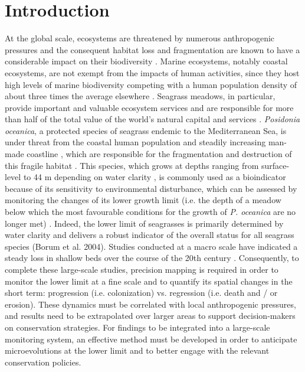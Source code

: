 \section{Introduction}\label{chapitre3_1}
At the global scale, ecosystems are threatened by numerous anthropogenic pressures \citep{hoekstra_confronting_2004, halpern_global_2008} and the consequent habitat loss and fragmentation are known to have a considerable impact on their biodiversity \citep{brooks_habitat_2002, haddad_habitat_2015}. Marine ecosystems, notably coastal ecosystems, are not exempt from the impacts of human activities, since they host high levels of marine biodiversity \citep{halpern_global_2008} competing with a human population density of about three times the average elsewhere \citep{small_global_2003}. Seagrass meadows, in particular, provide important and valuable ecosystem services and are responsible for more than half of the total value of the world’s natural capital and services \citep{costanza_value_1997, millenium_ecosystem_assessment_ecosystem_2005, ipbes_global_2019}. \textit{Posidonia oceanica}, a protected species of seagrass endemic to the Mediterranean Sea, is under threat from the coastal human population and steadily increasing man-made coastline \citep{holon_impact_2015, holon_predictive_2018}, which are responsible for the fragmentation and destruction of this fragile habitat  \citep{montefalcone_human_2010, holon_impact_2015}. This species, which grows at depths ranging from surface-level to 44 m depending on water clarity \citep{boudouresque_regression_2009}, is commonly used as a bioindicator because of its sensitivity to environmental disturbance, which can be assessed by monitoring the changes of its lower growth limit (i.e. the depth of a meadow below which the most favourable conditions for the growth of \textit{P. oceanica} are no longer met) \citep{boudouresque_regression_2009, ruiz_mediterranean_2009}. Indeed, the lower limit of seagrasses is primarily determined by water clarity and delivers a robust indicator of the overall status for all seagrass species (Borum et al. 2004). Studies conducted at a macro scale have indicated a steady loss in shallow beds over the course of the 20th century \citep{marba_mediterranean_2014, holon_impact_2015}. Consequently, to complete these large-scale studies, precision mapping is required in order to monitor the lower limit at a fine scale and to quantify its spatial changes in the short term: progression (i.e. colonization) vs. regression (i.e. death and / or erosion). These dynamics must be correlated with local anthropogenic pressures, and results need to be extrapolated over larger areas to support decision-makers on conservation strategies. For findings to be integrated into a large-scale monitoring system, an effective method must be developed in order to anticipate microevolutions at the lower limit and to better engage with the relevant conservation policies.

